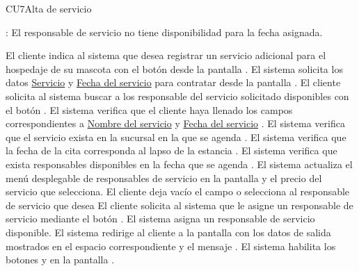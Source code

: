 \begin{UseCase}{CU7}{Alta de servicio}
{\begin{Titemize}
		: El responsable de servicio no tiene disponibilidad para la fecha asignada.
	\end{Titemize}
	}
\end{UseCase}

\begin{UCtrayectoria}
	\UCpaso[] El cliente indica al sistema que desea registrar un servicio adicional para el hospedaje de su mascota con el botón  desde la pantalla .
	\UCpaso[] \label{UC7.IntroduceDatosCita} El sistema solicita los datos \hyperlink{CATALOGO_SERVICIOS.Nombre_servicio}{Servicio} y \hyperlink{CITA.Fecha}{Fecha del servicio} para contratar desde la pantalla .
	\UCpaso[] El cliente solicita al sistema buscar a los responsable del servicio solicitado disponibles con el botón .
	\UCpaso[] El sistema verifica que el cliente haya llenado los campos  correspondientes a \hyperlink{CATALOGO_SERVICIOS.Nombre_servicio}{Nombre del servicio} y \hyperlink{CITA.Fecha}{Fecha del servicio}  .
	\UCpaso[] El sistema verifica que el servicio exista en la sucursal en la que se agenda  .
	\UCpaso[] El sistema verifica que la fecha de la cita corresponda al lapso de la estancia  .
	\UCpaso[] El sistema verifica que exista responsables disponibles en la fecha que se agenda  .
	\UCpaso[] El sistema actualiza el menú desplegable de responsables de servicio en la pantalla  y el precio del servicio que selecciona.
	\UCpaso[] \label{UC7.IntroduceResponsableServicio} El cliente deja vacío el campo o selecciona al responsable de servicio que desea 
	\UCpaso[] El cliente solicita al sistema que le asigne un responsable de servicio mediante el botón .
	\UCpaso[] El sistema asigna un responsable de servicio disponible.
	\UCpaso[] El sistema redirige al cliente a la pantalla  con los datos de salida mostrados en el espacio correspondiente y el mensaje .
	\UCpaso[] El sistema habilita los botones  y  en la pantalla .
\end{UCtrayectoria}

